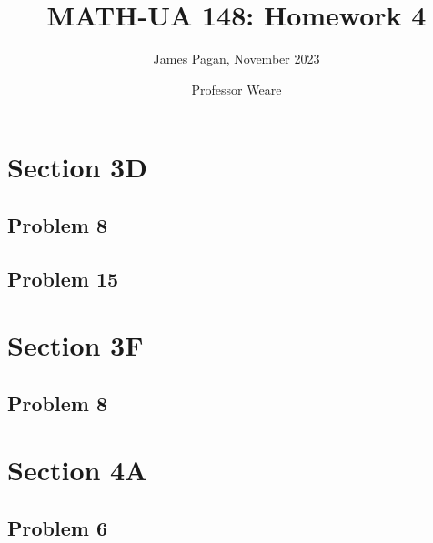 \documentclass[11pt]{article}
\title{MATH-UA 148: Homework 4}
\author{James Pagan, November 2023}
\date{Professor Weare}
\begin{document}
\maketitle
\tableofcontents


\section{Section 3D}


\subsection{Problem 8}




\subsection{Problem 15}


\section{Section 3F}


\subsection{Problem 8}


\section{Section 4A}


\subsection{Problem 6}

\end{document}
